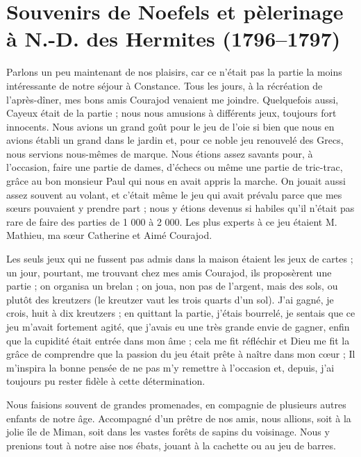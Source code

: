 \documentclass[11pt,a4paper]{report}
\begin{document}
\chapter{Souvenirs de Noefels et pèlerinage à N.-D. des Hermites (1796--1797)}

Parlons un peu maintenant de nos plaisirs, car ce n'était pas la partie la moins intéressante de notre séjour à Constance. Tous les jours, à la récréation de l'après-dîner, mes bons amis Courajod venaient me joindre. Quelquefois aussi, Cayeux était de la partie ; nous nous amusions à différents jeux, toujours fort innocents. Nous avions un grand goût pour le jeu de l'oie si bien que nous en avions établi un grand dans le jardin et, pour ce noble jeu renouvelé des Grecs, nous servions nous-mêmes de marque. Nous étions assez savants pour, à l'occasion, faire une partie de dames, d'échecs ou même une partie de tric-trac, grâce au bon monsieur Paul qui nous en avait appris la marche. On jouait aussi assez souvent au volant, et c'était même le jeu qui avait prévalu parce que mes sœurs pouvaient y prendre part ; nous y étions devenus si habiles qu'il n'était pas rare de faire des parties de 1 000 à 2 000. Les plus experts à ce jeu étaient M. Mathieu, ma sœur Catherine et Aimé Courajod.

Les seuls jeux qui ne fussent pas admis dans la maison étaient les jeux de cartes ; un jour, pourtant, me trouvant chez mes amis Courajod, ils proposèrent une partie ; on organisa un brelan ; on joua, non pas de l'argent, mais des sols, ou plutôt des kreutzers (le kreutzer vaut les trois quarts d'un sol). J'ai gagné, je crois, huit à dix kreutzers ; en quittant la partie, j'étais bourrelé, je sentais que ce jeu m'avait fortement agité, que j'avais eu une très grande envie de gagner, enfin que la cupidité était entrée dans mon âme ; cela me fit réfléchir et Dieu me fit la grâce de comprendre que la passion du jeu était prête à naître dans mon cœur ; Il m'inspira la bonne pensée de ne pas m'y remettre à l'occasion et, depuis, j'ai toujours pu rester fidèle à cette détermination.

Nous faisions souvent de grandes promenades, en compagnie de plusieurs autres enfants de notre âge. Accompagné d'un prêtre de nos amis, nous allions, soit à la jolie île de Miman, soit dans les vastes forêts de sapins du voisinage. Nous y prenions tout à notre aise nos ébats, jouant à la cachette ou au jeu de barres.
\end{document}
